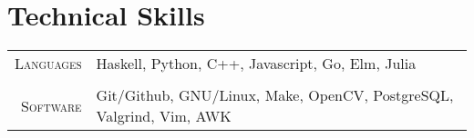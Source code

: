 \documentclass[a4paper,10pt]{article}
\newcommand{\br}{\\\multicolumn{2}{c}{}}
\begin{document}
\section{Technical Skills}
\begin{tabular}{r|p{15cm}}
    \textsc{\small Languages} &
    Haskell,
    Python,
    C++,
    Javascript,
    Go,
    Elm,
    Julia\br\\

    \textsc{\small Software} &
    Git/Github,
    GNU/Linux,
    Make,
    OpenCV,
    PostgreSQL,
    Valgrind,
    Vim,
    AWK
\end{tabular}
\end{document}
